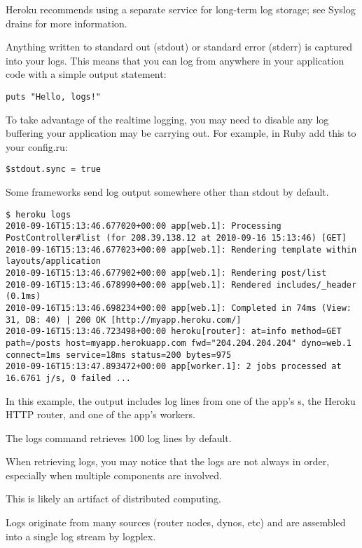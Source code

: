 Heroku recommends using a separate service for long-term log storage; see
Syslog drains for more information.


Anything written to standard out (stdout) or standard error (stderr)
is captured into your logs. This means that you can log from anywhere
in your application code with a simple output statement:
\begin{verbatim}
puts "Hello, logs!"
\end{verbatim}
To take advantage of the realtime logging, you may need to disable
any log buffering your application may be carrying out. For example,
in Ruby add this to your config.ru:
\begin{verbatim}
$stdout.sync = true
\end{verbatim}
Some frameworks send log output somewhere other than stdout by
default. 

\begin{verbatim}
$ heroku logs
2010-09-16T15:13:46.677020+00:00 app[web.1]: Processing PostController#list (for 208.39.138.12 at 2010-09-16 15:13:46) [GET]
2010-09-16T15:13:46.677023+00:00 app[web.1]: Rendering template within layouts/application
2010-09-16T15:13:46.677902+00:00 app[web.1]: Rendering post/list
2010-09-16T15:13:46.678990+00:00 app[web.1]: Rendered includes/_header (0.1ms)
2010-09-16T15:13:46.698234+00:00 app[web.1]: Completed in 74ms (View: 31, DB: 40) | 200 OK [http://myapp.heroku.com/]
2010-09-16T15:13:46.723498+00:00 heroku[router]: at=info method=GET path=/posts host=myapp.herokuapp.com fwd="204.204.204.204" dyno=web.1 connect=1ms service=18ms status=200 bytes=975
2010-09-16T15:13:47.893472+00:00 app[worker.1]: 2 jobs processed at 16.6761 j/s, 0 failed ...
\end{verbatim}
In this example, the output includes log lines from one of the app’s
s, the Heroku HTTP router, and one of the app’s workers.

The logs command retrieves 100 log lines by default.


When retrieving logs, you may notice that the logs are not always
in order, especially when multiple components are involved. 

This
is likely an artifact of distributed computing. 

Logs originate from
many sources (router nodes, dynos, etc) and are assembled into a
single log stream by logplex. 


